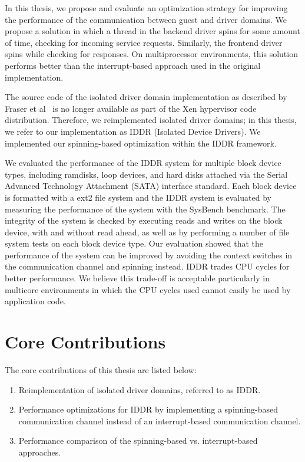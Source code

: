 In this thesis, we propose and evaluate an optimization strategy
for improving the performance of the communication between guest and
driver domains. We propose a solution in which a thread in the backend
driver spins for some amount of time, checking for incoming service
requests. Similarly, the frontend driver spins while checking for
responses.  On multiprocessor environments, this solution performs better
than the interrupt-based approach used in the original implementation.

The source code of the isolated driver domain implementation as described 
by Fraser et al~\cite{driverdomain} is no longer available as part 
of the Xen hypervisor code distribution.  Therefore, we reimplemented isolated
driver domains; in this thesis, we refer to our implementation as IDDR
(Isolated Device Drivers). We implemented our spinning-based optimization 
within the IDDR framework.

We evaluated the performance of the IDDR system for multiple block device
types, including ramdisks, loop devices, and hard disks attached via 
the Serial Advanced Technology Attachment (SATA) interface standard. 
Each block device
is formatted with a ext2 file system and the IDDR system is evaluated
by measuring the performance of the system with the SysBench benchmark. 
The integrity of the system is checked by executing reads and writes on 
the block device, with and without read ahead, as well as by performing 
a number of file system tests on each block device type.  
Our evaluation showed that the performance
of the system can be improved by avoiding the context switches in
the communication channel and spinning instead. 
IDDR trades CPU cycles for better performance.  We believe this 
trade-off is acceptable particularly in multicore environments in 
which the CPU cycles used cannot easily be used by application code.

\section{Core Contributions}

The core contributions of this thesis are listed below: 
\begin{enumerate}
\item Reimplementation of isolated driver domains, referred to as IDDR.
\item Performance optimizations for IDDR by implementing a spinning-based 
        communication channel instead of an interrupt-based communication channel. 
\item Performance comparison of the spinning-based vs. interrupt-based approaches.
\end{enumerate}


